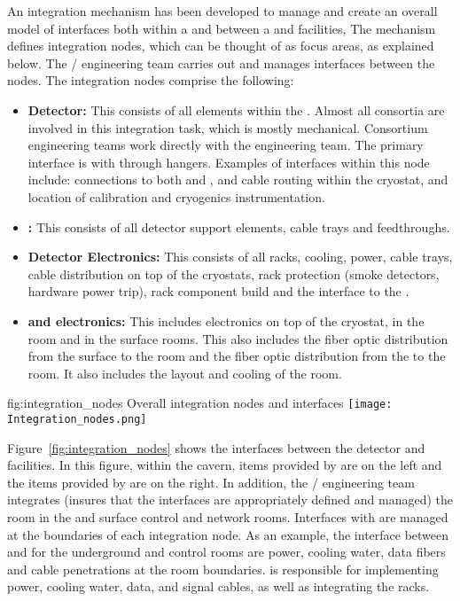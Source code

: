 An integration mechanism has been developed to manage and create an
overall model of interfaces both within a  and
between a  and facilities, The mechanism defines
integration nodes, which can be thought of as focus areas, as
explained below.  The / engineering team carries out and
manages interfaces between the nodes. The integration nodes comprise the following:
\begin{itemize}
\item {\bf Detector:} This consists of all  elements within
  the . Almost all consortia are involved in this
  integration task, which is mostly mechanical. Consortium engineering
  teams work directly with the  engineering team.  The
  primary interface is with  through hangers. Examples of
  interfaces within this node include:  connections to both
   and ,  and  cable
  routing within the cryostat, and location of calibration and
  cryogenics instrumentation.
\item {\bf {}:} This consists of all detector support elements,
  cable trays and feedthroughs.
\item {\bf Detector Electronics:} This consists of all racks, cooling,
  power, cable trays, cable distribution on top of the cryostats, rack
  protection (smoke detectors, hardware power trip), rack component
  build and the interface to the .
\item {\bf {} and electronics:} This includes electronics on
  top of the cryostat, in the  room and in the surface
  rooms. This also includes the fiber optic distribution from the
  surface to the  room and the fiber optic distribution
  from the  to the  room. It also includes the
  layout and cooling of the  room.
\end{itemize}

\begin{dunefigure}{fig:integration_nodes}
  {Overall integration nodes and interfaces}
  \texttt{[image: Integration\_nodes.png]}
\end{dunefigure}
Figure~\ref{fig:integration_nodes} shows the interfaces between the
detector and facilities. In this figure, within the cavern, items
provided by  are on the left and the items provided by
 are on the right. In addition, the / engineering
team integrates (insures that the interfaces are appropriately defined
and managed) the  room in the  and surface
control and network rooms. Interfaces with 
are managed at the boundaries of each integration node. As an example,
the interface between  and  for the
underground  and control rooms are power, cooling water,
data fibers and cable penetrations at the room
boundaries.  is responsible for implementing power,
cooling water, data, and signal cables, as well as integrating the
racks.


